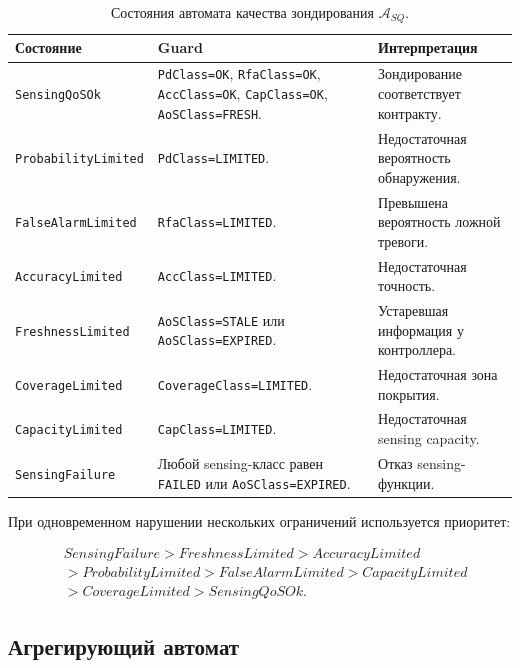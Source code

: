 \documentclass[12pt,a4paper]{article}
\begin{document}
\begin{table}[htbp]
\centering
\small
\setlength{\tabcolsep}{4pt}
\begin{tabularx}{\textwidth}{p{}YY}
\toprule
Состояние & Guard & Интерпретация \\
\midrule
\texttt{SensingQoSOk} & \texttt{PdClass=OK}, \texttt{RfaClass=OK}, \texttt{AccClass=OK}, \texttt{CapClass=OK}, \texttt{AoSClass=FRESH}. & Зондирование соответствует контракту. \\
\texttt{ProbabilityLimited} & \texttt{PdClass=LIMITED}. & Недостаточная вероятность обнаружения. \\
\texttt{FalseAlarmLimited} & \texttt{RfaClass=LIMITED}. & Превышена вероятность ложной тревоги. \\
\texttt{AccuracyLimited} & \texttt{AccClass=LIMITED}. & Недостаточная точность. \\
\texttt{FreshnessLimited} & \texttt{AoSClass=STALE} или \texttt{AoSClass=EXPIRED}. & Устаревшая информация у контроллера. \\
\texttt{CoverageLimited} & \texttt{CoverageClass=LIMITED}. & Недостаточная зона покрытия. \\
\texttt{CapacityLimited} & \texttt{CapClass=LIMITED}. & Недостаточная sensing capacity. \\
\texttt{SensingFailure} & Любой sensing-класс равен \texttt{FAILED} или \texttt{AoSClass=EXPIRED}. & Отказ sensing-функции. \\
\bottomrule
\end{tabularx}
\caption{Состояния автомата качества зондирования $\mathcal{A}_{SQ}$.}
\label{tab:sensing_states}
\end{table}

При одновременном нарушении нескольких ограничений используется приоритет:

\begin{equation}
\begin{aligned}
&SensingFailure
> FreshnessLimited
> AccuracyLimited\\
&> ProbabilityLimited
> FalseAlarmLimited
> CapacityLimited\\
&> CoverageLimited
> SensingQoSOk.
\end{aligned}
\end{equation}

\subsection{Агрегирующий автомат}
\end{document}
